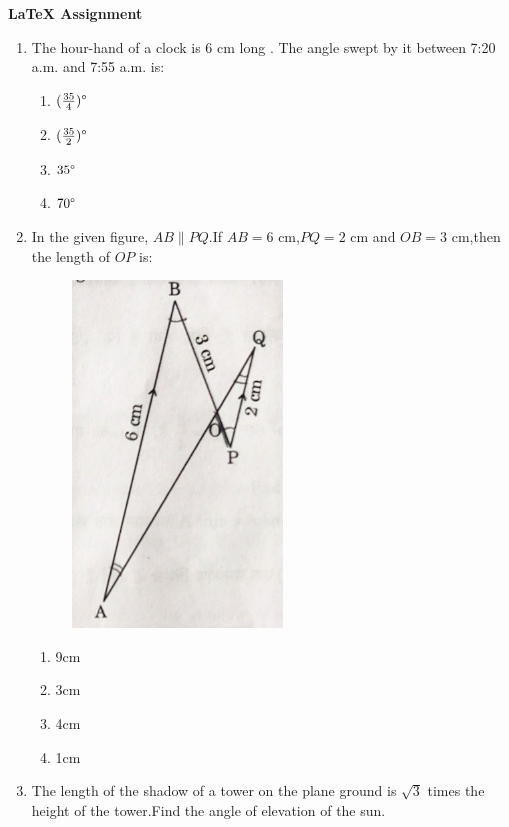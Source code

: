 \documentclass{article}
\begin{document}
\begin{center}
    \textbf{ \LaTeX{} Assignment}
\end{center}

\begin{enumerate}
    \item The hour-hand of a clock is 6 cm long . The angle swept by it between 7:20 a.m. and 7:55 a.m. is:

\begin{enumerate}[label=(\alph*)]
    \item $(\frac{35}{4})\degree$
    \item $(\frac{35}{2})\degree$
    \item $35\degree$
    \item $70\degree$
\end{enumerate}

\item In the given figure, $ AB \parallel PQ $.If $AB=6$ cm,$PQ=2$ cm and $OB=3$ cm,then the length of $OP$ is:

\begin{figure}[h]
    \centering
    \includegraphics[width=5 cm]{30_2_1_Q18.png}
    \caption{}
    \label{fig:30_2_1_Q18}
\end{figure}
\begin{enumerate}[label=(\alph*)]
    \item 9cm
    \item 3cm
    \item 4cm 
    \item 1cm
\end{enumerate}

\item The length of the shadow of a tower on the plane ground is $\sqrt{3}$ times the height of the tower.Find the angle of elevation of the sun.


\end{enumerate}
\end{document}
